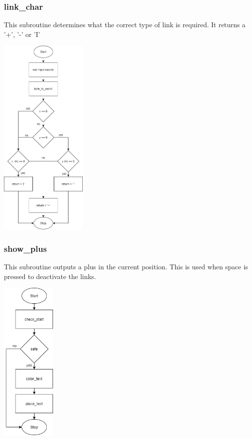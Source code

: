 \documentclass{article}
\begin{document}
    \subsubsection{link\_char}
        This subroutine determines what the correct type of link is
        required.  It returns a '+', '-' or 'I'
        \begin{center}
            {\includegraphics[height=10cm]{link_char.png}\centering} 
        \end{center}
        \newpage

    \subsubsection{show\_plus}
        This subroutine outputs a plus in the current position.
        This is used when space is pressed to deactivate the links.
        \begin{center}
            {\includegraphics[height=8cm]{show_plus.png}\centering} 
        \end{center}
        
\end{document}

